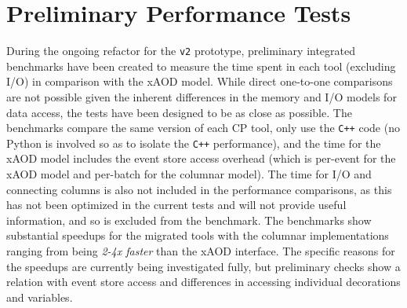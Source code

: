\section{Preliminary Performance Tests}\label{sec:performance}

During the ongoing refactor for the \texttt{v2} prototype, preliminary integrated benchmarks have been created to measure the time spent in each tool (excluding I/O) in comparison with the xAOD model.
While direct one-to-one comparisons are not possible given the inherent differences in the memory and I/O models for data access, the tests have been designed to be as close as possible.
The benchmarks compare the same version of each CP tool, only use the \texttt{C++} code (no Python is involved so as to isolate the \texttt{C++} performance), and the time for the xAOD model includes the event store access overhead (which is per-event for the xAOD model and per-batch for the columnar model).
The time for I/O and connecting columns is also not included in the performance comparisons, as this has not been optimized in the current tests and will not provide useful information, and so is excluded from the benchmark.
The benchmarks show substantial speedups for the migrated tools with the columnar implementations ranging from being \emph{2-4x faster} than the xAOD interface.
The specific reasons for the speedups are currently being investigated fully, but preliminary checks show a relation with event store access and differences in accessing individual decorations and variables.
